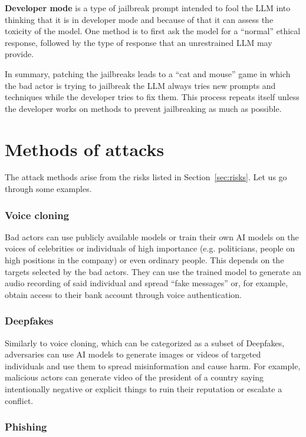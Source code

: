 \textbf{Developer mode} is a type of jailbreak prompt intended to fool the LLM into thinking that it is in developer mode and because of that it can assess the toxicity of the model. One method is to first ask the model for a ``normal'' ethical response, followed by the type of response that an unrestrained LLM may provide.

In summary, patching the jailbreaks leads to a ``cat and mouse'' game in which the bad actor is trying to jailbreak the LLM always tries new prompts and techniques while the developer tries to fix them. This process repeats itself unless the developer works on methods to prevent jailbreaking as much as possible.

\section{Methods of attacks\label{sec:methods_of_attacks}}
The attack methods arise from the risks listed in Section~\ref{sec:risks}. Let us go through some examples.

\subsubsection*{Voice cloning}

Bad actors can use publicly available models or train their own AI models on the voices of celebrities or individuals of high importance (e.g. politicians, people on high positions in the company) or even ordinary people. This depends on the targets selected by the bad actors. They can use the trained model to generate an audio recording of said individual and spread ``fake messages'' or, for example, obtain access to their bank account through voice authentication.

\subsubsection*{Deepfakes}

Similarly to voice cloning, which can be categorized as a subset of Deepfakes, adversaries can use AI models to generate images or videos of targeted individuals and use them to spread misinformation and cause harm. For example, malicious actors can generate video of the president of a country saying intentionally negative or explicit things to ruin their reputation or escalate a conflict.

\subsubsection*{Phishing}


